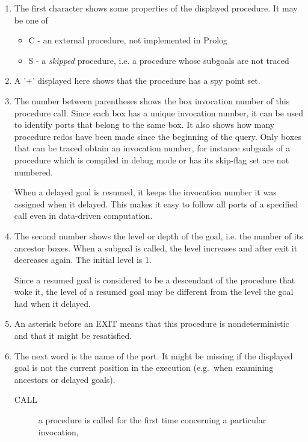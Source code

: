 \begin{enumerate}
\item The first character shows some properties of the
displayed procedure.
It may be one of
\begin{itemize}
\item C - an external procedure, not implemented in Prolog
\item S - a {\it skipped} procedure, i.e. a procedure whose
subgoals are not traced
\end{itemize}

\item A '+' displayed here shows that the procedure has a spy point set.

\item The number between parentheses shows the box invocation number
of this procedure call.  Since each box has a unique invocation
number, it can be used to identify ports that belong to the same box.
It also shows how many procedure redos have been made since the
beginning of the query.  Only boxes that can be traced obtain an
invocation number, for instance subgoals of a procedure which is
compiled in debug mode or has its skip-flag set are not numbered.

When a delayed goal is resumed, it keeps the invocation number it was
assigned when it delayed.  This makes it easy to follow all ports of a
specified call even in data-driven computation.

\item The second number shows the level or depth of the goal,
i.e. the number of its ancestor boxes.  When a subgoal is called, the
level increases and after exit it decreases again.  The initial level
is 1.

Since a resumed goal is considered to be a descendant of the procedure
that woke it, the level of a resumed goal may be different from
the level the goal had when it delayed.

\item An asterisk before an EXIT means that this
procedure is nondeterministic and that it might be resatisfied.

\item The next word is the name of the port.
It might be missing if the displayed goal is not the current position
in the execution (e.g.\ when examining ancestors or delayed goals).

\begin{description}
\item[CALL] a procedure is called for the first time concerning a particular
invocation,


\end{description}
\end{enumerate}
